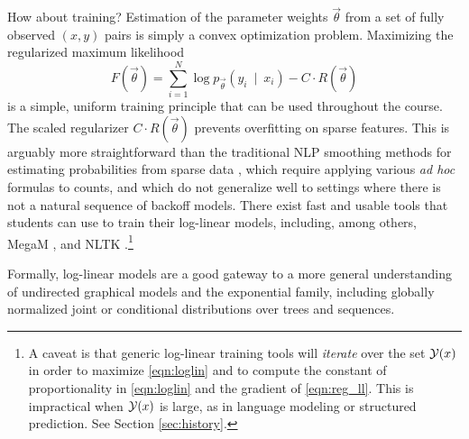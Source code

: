 \documentclass[11pt,letterpaper]{article}
\DeclareMathOperator*{\argmax}{arg\,max}
\begin{document}
How about training?  Estimation of the parameter weights
$\vec{\theta}$ from a set of fully observed $(x,y)$ pairs is simply a
convex optimization problem.  Maximizing the regularized maximum
likelihood
\begin{equation}\label{eqn:reg_ll}
  F(\vec{\theta}) = \sum_{i=1}^N \log{p_{\vec{\theta}}\left(y_i\ \mid\ x_i\right)} - C \cdot R(\vec{\theta})
\end{equation}
is a simple, uniform training principle that can be used throughout
the course.  The scaled regularizer $C\cdot R(\vec{\theta})$
prevents overfitting on sparse features.
This is arguably more straightforward than the traditional NLP
smoothing methods for estimating probabilities from sparse data
\cite{chen-goodman-1996}, which require applying various {\em ad hoc}
formulas to counts, and which do not generalize well to settings where
there is not a natural sequence of backoff models.  There exist 
fast and usable tools that students can use to train their log-linear
models, including, among others, MegaM \cite{daume04cg-bfgs}, 
and NLTK \cite{bird2009natural}.\footnote{\label{fn:bigY}A caveat is that generic
  log-linear training tools will {\em iterate} over the set ${\cal
    Y}(x)$ in order to maximize
  \eqref{eqn:loglin} and to compute the constant of proportionality
  in \eqref{eqn:loglin} and the gradient of
  \eqref{eqn:reg_ll}.  This is impractical when ${\cal Y}(x)$ is large, as in
  language modeling or structured prediction.  See Section \ref{sec:history}.
}

Formally, log-linear models are a good gateway to a more general
understanding of undirected graphical models and the exponential
family, including globally normalized joint or conditional
distributions over trees and sequences.
\end{document}
